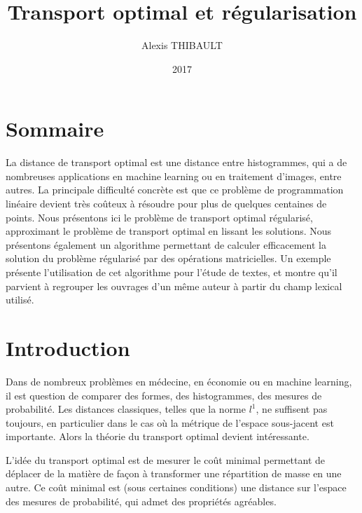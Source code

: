 
\usepackage{subcaption}

\DeclareMathOperator{\diag}{\mathbf{diag}}
\DeclareMathOperator{\Ccal}{\mathcal{C}}

\newcommand{\tab}{\ \ \ \ }

\title{Transport optimal et régularisation}
\author{Alexis THIBAULT}
\date{2017}



\maketitle

\section*{Sommaire}
La distance de transport optimal est une distance entre histogrammes, qui a de nombreuses applications en machine learning ou en traitement d'images, entre autres. La principale difficulté concrète est que ce problème de programmation linéaire devient très coûteux à résoudre pour plus de quelques centaines de points. Nous présentons ici le problème de transport optimal régularisé, approximant le problème de transport optimal en lissant les solutions. Nous présentons également un algorithme permettant de calculer efficacement la solution du problème régularisé par des opérations matricielles. Un exemple présente l'utilisation de cet algorithme pour l'étude de textes, et montre qu'il parvient à regrouper les ouvrages d'un même auteur à partir du champ lexical utilisé.



\section{Introduction}
Dans de nombreux problèmes en médecine, en économie ou en machine learning, il est question de comparer des formes, des histogrammes, des mesures de probabilité.
Les distances classiques, telles que la norme $l^1$, ne suffisent pas toujours, en particulier dans le cas où la métrique de l'espace sous-jacent est importante. Alors la théorie du transport  optimal \cite{villani08} devient intéressante.

L'idée du transport optimal est de mesurer le coût minimal permettant de déplacer de la matière de façon à transformer une répartition de masse en une autre. Ce coût minimal est (sous certaines conditions) une distance sur l'espace des mesures de probabilité\cite{villani08}, qui admet des propriétés agréables.


